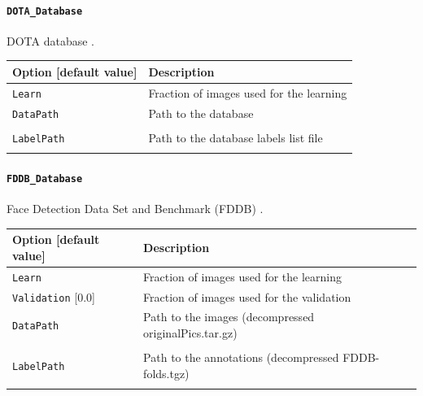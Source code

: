 \documentclass[a4paper,11pt,oneside]{article}
\begin{document}
\paragraph{\texorpdfstring{%
\lstinline[basicstyle=\ttfamily\bfseries]!DOTA_Database!}
{DOTA\_Database}}
DOTA database \citep{DOTA}.

\begin{center}
 \begin{tabular}{| p{5cm} | p{10cm} | }
 \hline
 Option [default value] & Description\\
 \hline\hline
  \lstinline!Learn! & Fraction of images used for the learning \\
  \lstinline!DataPath! & Path to the database \\
   & \\
  \lstinline!LabelPath! & Path to the database labels list file \\
  \noindent [] & \\
 \hline
\end{tabular}
\end{center}


\paragraph{\texorpdfstring{%
\lstinline[basicstyle=\ttfamily\bfseries]!FDDB_Database!}{FDDB\_Database}}
Face Detection Data Set and Benchmark (FDDB) \citep{Jain2010}.

\begin{center}
 \begin{tabular}{| p{5cm} | p{10cm} | }
 \hline
 Option [default value] & Description\\
 \hline\hline
  \cellcolor{requiredcolor}
  \lstinline!Learn! & Fraction of images used for the learning \\
  \lstinline!Validation! [0.0] & Fraction of images used for the validation \\
  \lstinline!DataPath! & Path to the images
  (decompressed originalPics.tar.gz) \\
   & \\
  \lstinline!LabelPath! & Path to the annotations
  (decompressed FDDB-folds.tgz) \\
  \noindent [\lstinline!$N2D2_DATA!/FDDB] & \\
 \hline
\end{tabular}
\end{center}
\end{document}
